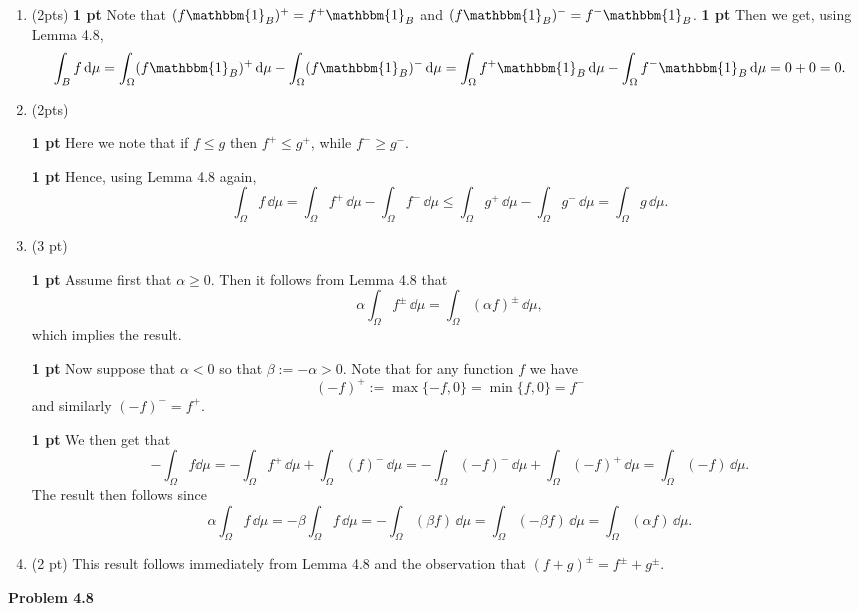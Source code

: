 \begin{enumerate}[label={(\alph*)}]
\item (2pts)
\textbf{1 pt}
Note that $(f \mathbbm{1}_{B})^+ = f^+ \mathbbm{1}_B$ and $(f \mathbbm{1}_B)^- = f^- \mathbbm{1}_B$. 
\textbf{1 pt}
Then we get, using Lemma 4.8,
\[
	\int_{B} f \, \dd \mu = \int_\Omega (f \mathbbm{1}_{B})^+ \, \dd \mu - \int_\Omega (f \mathbbm{1}_{B})^- \, \dd \mu
	= \int_\Omega f^+ \mathbbm{1}_B \, \dd \mu - \int_\Omega f^- \mathbbm{1}_B \, \dd \mu = 0 + 0 = 0.
\]
\item (2pts)

\textbf{1 pt}
Here we note that if $f \le g$ then $f^+ \le g^+$, while $f^- \ge g^-$. 

\textbf{1 pt}
Hence, using Lemma 4.8 again, 
\[
	\int_\Omega f \, \dd \mu = \int_\Omega f^+ \, \dd \mu - \int_\Omega f^- \, \dd \mu
	\le \int_\Omega g^+ \, \dd \mu - \int_\Omega g^- \, \dd \mu = \int_\Omega g \, \dd \mu.
\]
\item (3 pt)

\textbf{1 pt}
Assume first that $\alpha \ge  0$. Then it follows from Lemma 4.8 that
\[
	\alpha \int_\Omega f^\pm \, \dd \mu = \int_\Omega (\alpha f)^\pm \, \dd \mu,
\]
which implies the result.

\textbf{1 pt}
Now suppose that $\alpha < 0$ so that $\beta := -\alpha > 0$. Note that for any function $f$ we have
\[
	(-f)^+ := \max\{-f,0\} = \min\{f,0\} = f^-
\]
and similarly $(-f)^- = f^+$.

\textbf{1 pt}
We then get that
\[
	- \int_\Omega f \dd \mu = -\int_\Omega f^+ \, \dd \mu + \int_\Omega (f)^- \, \dd \mu
	= -\int_\Omega (-f)^- \, \dd \mu + \int_\Omega (-f)^+ \, \dd \mu = \int_\Omega (-f) \, \dd \mu. 
\]
The result then follows since
\[
	\alpha \int_\Omega f \, \dd \mu = - \beta \int_\Omega f\, \dd \mu
	= - \int_\Omega (\beta f) \, \dd \mu = \int_\Omega (-\beta f) \, \dd \mu
	= \int_\Omega (\alpha f) \, \dd \mu.
\]
\item (2 pt)
This result follows immediately from Lemma 4.8 and the observation that $(f+g)^\pm = f^\pm + g^\pm$.
\end{enumerate}

\bigskip

\textbf{Problem 4.8}

